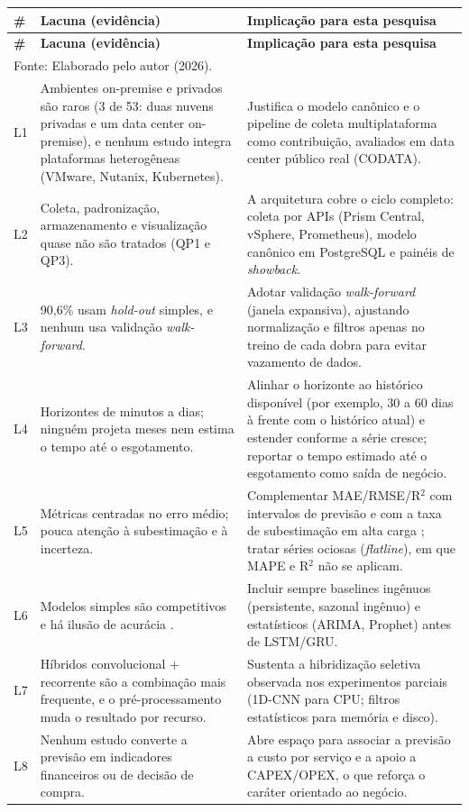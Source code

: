 {\footnotesize
\setlength{\tabcolsep}{4pt}
\renewcommand{\arraystretch}{1.2}
\begin{longtable}{p{0.6cm}p{6.4cm}p{8.0cm}}
\toprule
\textbf{\#} & \textbf{Lacuna (evidência)} & \textbf{Implicação para esta pesquisa} \\
\midrule
\endfirsthead
\toprule
\textbf{\#} & \textbf{Lacuna (evidência)} & \textbf{Implicação para esta pesquisa} \\
\midrule
\endhead
\bottomrule
\multicolumn{3}{l}{Fonte: Elaborado pelo autor (2026).}\\
\endlastfoot
L1 & Ambientes on-premise e privados são raros (3 de 53: duas nuvens privadas e um data center on-premise), e nenhum estudo integra plataformas heterogêneas (VMware, Nutanix, Kubernetes). & Justifica o modelo canônico e o pipeline de coleta multiplataforma como contribuição, avaliados em data center público real (CODATA). \\
L2 & Coleta, padronização, armazenamento e visualização quase não são tratados (QP1 e QP3). & A arquitetura cobre o ciclo completo: coleta por APIs (Prism Central, vSphere, Prometheus), modelo canônico em PostgreSQL e painéis de \textit{showback}. \\
L3 & 90,6\% usam \textit{hold-out} simples, e nenhum usa validação \textit{walk-forward}. & Adotar validação \textit{walk-forward} (janela expansiva), ajustando normalização e filtros apenas no treino de cada dobra para evitar vazamento de dados. \\
L4 & Horizontes de minutos a dias; ninguém projeta meses nem estima o tempo até o esgotamento. & Alinhar o horizonte ao histórico disponível (por exemplo, 30 a 60 dias à frente com o histórico atual) e estender conforme a série cresce; reportar o tempo estimado até o esgotamento como saída de negócio. \\
L5 & Métricas centradas no erro médio; pouca atenção à subestimação e à incerteza. & Complementar MAE/RMSE/R$^2$ com intervalos de previsão e com a taxa de subestimação em alta carga \cite{jin2026,rossi2025}; tratar séries ociosas (\textit{flatline}), em que MAPE e R$^2$ não se aplicam. \\
L6 & Modelos simples são competitivos e há ilusão de acurácia \cite{christofidi2023a,naik2025}. & Incluir sempre baselines ingênuos (persistente, sazonal ingênuo) e estatísticos (ARIMA, Prophet) antes de LSTM/GRU. \\
L7 & Híbridos convolucional + recorrente são a combinação mais frequente, e o pré-processamento muda o resultado por recurso. & Sustenta a hibridização seletiva observada nos experimentos parciais (1D-CNN para CPU; filtros estatísticos para memória e disco). \\
L8 & Nenhum estudo converte a previsão em indicadores financeiros ou de decisão de compra. & Abre espaço para associar a previsão a custo por serviço e a apoio a CAPEX/OPEX, o que reforça o caráter orientado ao negócio. \\
\end{longtable}
}

